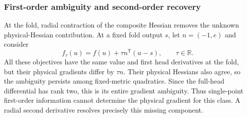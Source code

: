 \documentclass[10pt,a4paper]{article}
\begin{document}
\subsubsection{First-order ambiguity and second-order recovery}
At the fold, radial contraction of the composite Hessian removes the unknown physical-Hessian contribution. At a fixed fold output $s$, let $n=(-1,e)$ and consider
\begin{equation}
 f_\tau(u)=f(u)+\tau n^{\mathsf T}(u-s),\qquad \tau\in\mathbb R.
 \label{eq:ambiguity}
\end{equation}
All these objectives have the same value and first head derivatives at the fold, but their physical gradients differ by $\tau n$. Their physical Hessians also agree, so the ambiguity persists among fixed-metric quadratics. Since the full-head differential has rank two, this is its entire gradient ambiguity. Thus single-point first-order information cannot determine the physical gradient for this class. A radial second derivative resolves precisely this missing component.
\end{document}
